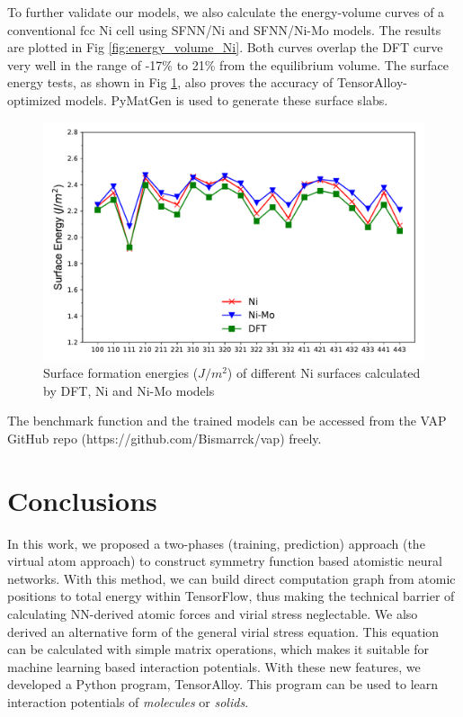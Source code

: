 \documentclass[preprint]{revtex4-2}
\begin{document}
To further validate our models, we also calculate the energy-volume curves of a 
conventional fcc Ni cell using SFNN/Ni and SFNN/Ni-Mo models. The results are 
plotted in Fig \ref{fig:energy_volume_Ni}. Both curves overlap the DFT curve 
very well in the range of -17\% to 21\% from the equilibrium volume. The surface
energy tests, as shown in Fig \ref{fig:surface_energy_Ni}, also proves the 
accuracy of TensorAlloy-optimized models. PyMatGen\cite{pymatgen,pymatgen-1} is 
used to generate these surface slabs.

% 
%
\begin{figure}[h!]
    \centering
    \includegraphics[scale=0.8]{figures/Ni_surface_energy.pdf}
\caption{\label{fig:surface_energy_Ni} Surface formation energies ($J/m^2$) of 
different Ni surfaces calculated by DFT, Ni and Ni-Mo models}
\end{figure}

The benchmark function and the trained models can be accessed from the VAP 
GitHub repo (https://github.com/Bismarrck/vap) freely.

% 
%
\section{Conclusions}
\label{section:conclusions}

In this work, we proposed a two-phases (training, prediction) approach 
(the virtual atom approach) to construct symmetry function based atomistic 
neural networks. 
With this method, we can build direct computation graph from atomic positions to 
total energy within TensorFlow, thus making the technical barrier of calculating 
NN-derived atomic forces and virial stress neglectable. We also derived an 
alternative form of the general virial stress equation. This equation can be 
calculated with simple matrix operations, which makes it suitable for machine 
learning based interaction potentials.
With these new features, we developed a Python program, TensorAlloy. This 
program can be used to learn interaction potentials of \textit{molecules} or 
\textit{solids}. 
\end{document}
